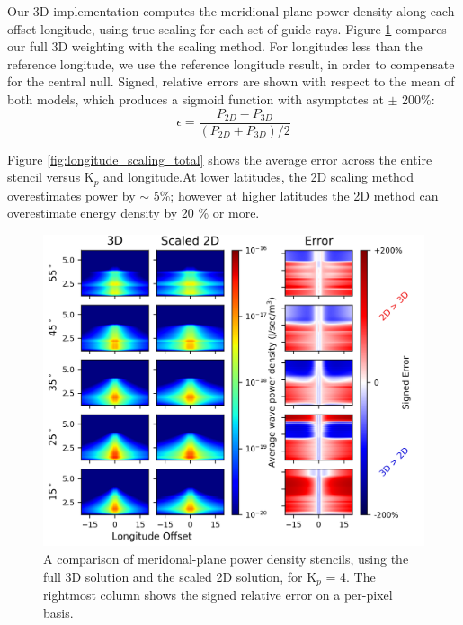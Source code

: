 Our 3D implementation computes the meridional-plane power density along each offset longitude, using true scaling for each set of guide rays. Figure \ref{fig:longitude_scaling_2d_vs_3d} compares our full 3D weighting with the \cite{Bortnik2005} scaling method. For longitudes less than the reference longitude, we use the reference longitude result, in order to compensate for the central null. Signed, relative errors are shown with respect to the mean of both models, which produces a sigmoid function with asymptotes at $\pm$ 200\%:
\begin{equation}
\epsilon = \frac{P_{2D} - P_{3D}}{(P_{2D} + P_{3D})/2}
\end{equation}

Figure \ref{fig:longitude_scaling_total} shows the average error across the entire stencil versus K$_p$ and longitude.At lower latitudes, the 2D scaling method overestimates power by $\sim$ 5\%; however at higher latitudes the 2D method can overestimate energy density by 20 \% or more.
\begin{figure}[h!]
\begin{center}
\includegraphics{figures/rel_error_grid_2d3d.png}
\caption[Difference between 2d and 3d longitude scaling]{A comparison of meridonal-plane power density stencils, using the full 3D solution and the scaled 2D solution, for K$_p$ = 4. The rightmost column shows the signed relative error on a per-pixel basis.}
\label{fig:longitude_scaling_2d_vs_3d}
\end{center}
\end{figure}

